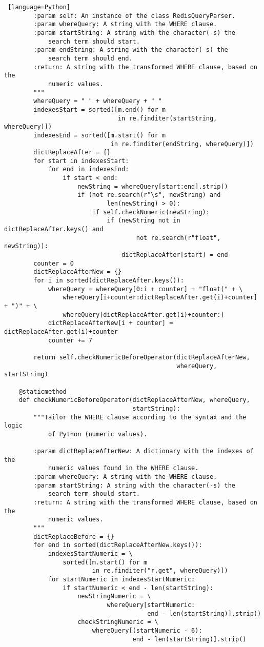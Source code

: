 \documentclass[11pt]{article}
\begin{document}
\begin{lstlisting} [language=Python]
        :param self: An instance of the class RedisQueryParser.
        :param whereQuery: A string with the WHERE clause.
        :param startString: A string with the character(-s) the
            search term should start.
        :param endString: A string with the character(-s) the
            search term should end.
        :return: A string with the transformed WHERE clause, based on the
            numeric values.
        """
        whereQuery = " " + whereQuery + " "
        indexesStart = sorted([m.end() for m
                               in re.finditer(startString, whereQuery)])
        indexesEnd = sorted([m.start() for m
                             in re.finditer(endString, whereQuery)])
        dictReplaceAfter = {}
        for start in indexesStart:
            for end in indexesEnd:
                if start < end:
                    newString = whereQuery[start:end].strip()
                    if (not re.search(r"\s", newString) and
                            len(newString) > 0):
                        if self.checkNumeric(newString):
                            if (newString not in dictReplaceAfter.keys() and
                                    not re.search(r"float", newString)):
                                dictReplaceAfter[start] = end
        counter = 0
        dictReplaceAfterNew = {}
        for i in sorted(dictReplaceAfter.keys()):
            whereQuery = whereQuery[0:i + counter] + "float(" + \
                whereQuery[i+counter:dictReplaceAfter.get(i)+counter] + ")" + \
                whereQuery[dictReplaceAfter.get(i)+counter:]
            dictReplaceAfterNew[i + counter] = dictReplaceAfter.get(i)+counter
            counter += 7

        return self.checkNumericBeforeOperator(dictReplaceAfterNew,
                                               whereQuery, startString)

    @staticmethod
    def checkNumericBeforeOperator(dictReplaceAfterNew, whereQuery,
                                   startString):
        """Tailor the WHERE clause according to the syntax and the logic
            of Python (numeric values).

        :param dictReplaceAfterNew: A dictionary with the indexes of the
            numeric values found in the WHERE clause.
        :param whereQuery: A string with the WHERE clause.
        :param startString: A string with the character(-s) the
            search term should start.
        :return: A string with the transformed WHERE clause, based on the
            numeric values.
        """
        dictReplaceBefore = {}
        for end in sorted(dictReplaceAfterNew.keys()):
            indexesStartNumeric = \
                sorted([m.start() for m
                        in re.finditer("r.get", whereQuery)])
            for startNumeric in indexesStartNumeric:
                if startNumeric < end - len(startString):
                    newStringNumeric = \
                            whereQuery[startNumeric:
                                       end - len(startString)].strip()
                    checkStringNumeric = \
                        whereQuery[(startNumeric - 6):
                                   end - len(startString)].strip()


\end{lstlisting}
\end{document}
